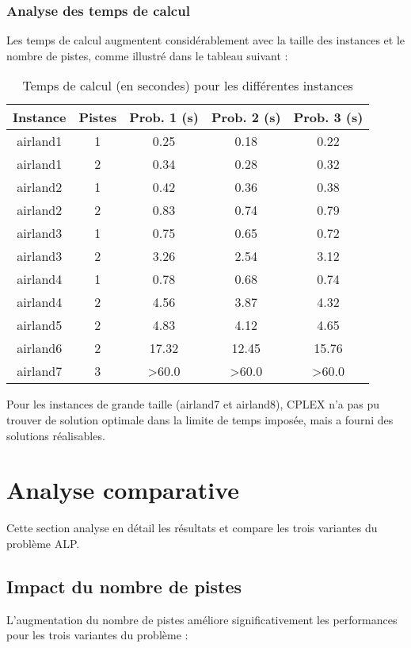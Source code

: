 \documentclass[a4paper,12pt]{report}
\begin{document}
\subsubsection{Analyse des temps de calcul}
Les temps de calcul augmentent considérablement avec la taille des instances et le nombre de pistes, comme illustré dans le tableau suivant :

\begin{table}[H]
  \centering
  \begin{tabular}{ccccc}
    \toprule
    \textbf{Instance} & \textbf{Pistes} & \textbf{Prob. 1 (s)} & \textbf{Prob. 2 (s)} & \textbf{Prob. 3 (s)} \\
    \midrule
    airland1 & 1 & 0.25 & 0.18 & 0.22 \\
    airland1 & 2 & 0.34 & 0.28 & 0.32 \\
    airland2 & 1 & 0.42 & 0.36 & 0.38 \\
    airland2 & 2 & 0.83 & 0.74 & 0.79 \\
    airland3 & 1 & 0.75 & 0.65 & 0.72 \\
    airland3 & 2 & 3.26 & 2.54 & 3.12 \\
    airland4 & 1 & 0.78 & 0.68 & 0.74 \\
    airland4 & 2 & 4.56 & 3.87 & 4.32 \\
    airland5 & 2 & 4.83 & 4.12 & 4.65 \\
    airland6 & 2 & 17.32 & 12.45 & 15.76 \\
    airland7 & 3 & >60.0 & >60.0 & >60.0 \\
    \bottomrule
  \end{tabular}
  \caption{Temps de calcul (en secondes) pour les différentes instances}
  \label{tab:compute_times}
\end{table}

Pour les instances de grande taille (airland7 et airland8), CPLEX n'a pas pu trouver de solution optimale dans la limite de temps imposée, mais a fourni des solutions réalisables.

\section{Analyse comparative}
Cette section analyse en détail les résultats et compare les trois variantes du problème ALP.

\subsection{Impact du nombre de pistes}
L'augmentation du nombre de pistes améliore significativement les performances pour les trois variantes du problème :
\end{document}
